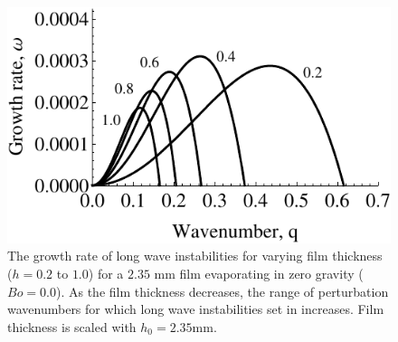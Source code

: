 \documentclass[a4paper,12pt]{article}
\begin{document}



  \begin{figure}
   \centering
   \includegraphics[width=\linewidth]{Fig25} 	
   \caption{The growth rate of long wave instabilities for varying film thickness ($h=0.2$ to $1.0$) for a $2.35$ mm film evaporating in zero gravity ($Bo=0.0$). As the film thickness decreases, the range of perturbation wavenumbers for which long wave instabilities set in increases. Film thickness is scaled with $h_0=2.35$mm.}
   \label{omega_q_1}
  \end{figure}

\end{document}
